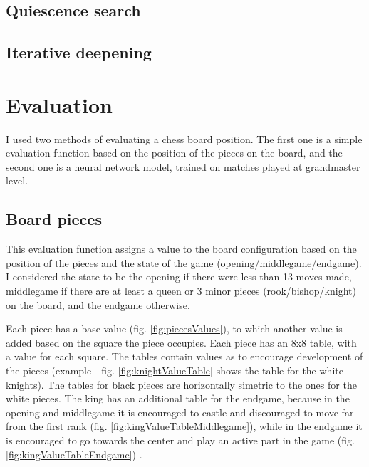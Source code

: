 \subsection{Quiescence search}
\label{subsec:ch4sec2subsec2}

\subsection{Iterative deepening}
\label{subsec:ch4sec2subsec3}

\section{Evaluation}
\label{sec:ch4sec3}

I used two methods of evaluating a chess board position. The first one is a simple evaluation function based on the position of the pieces on the board, and the second one is a neural network model, trained on matches played at grandmaster level.

\subsection{Board pieces}
\label{subsec:ch4sec3subsec1}

This evaluation function assigns a value to the board configuration based on the position of the pieces and the state of the game (opening/middlegame/endgame). I considered the state to be the opening if there were less than 13 moves made, middlegame if there are at least a queen or 3 minor pieces (rook/bishop/knight) on the board, and the endgame otherwise.

Each piece has a base value (fig. \ref{fig:piecesValues}), to which another value is added based on the square the piece occupies. Each piece has an 8x8 table, with a value for each square. The tables contain values as to encourage development of the pieces (example - fig. \ref{fig:knightValueTable} shows the table for the white knights). The tables for black pieces are horizontally simetric to the ones for the white pieces. The king has an additional table for the endgame, because in the opening and middlegame it is encouraged to castle and discouraged to move far from the first rank (fig. \ref{fig:kingValueTableMiddlegame}), while in the endgame it is encouraged to go towards the center and play an active part in the game (fig. \ref{fig:kingValueTableEndgame}) \cite{wikiEval}.

